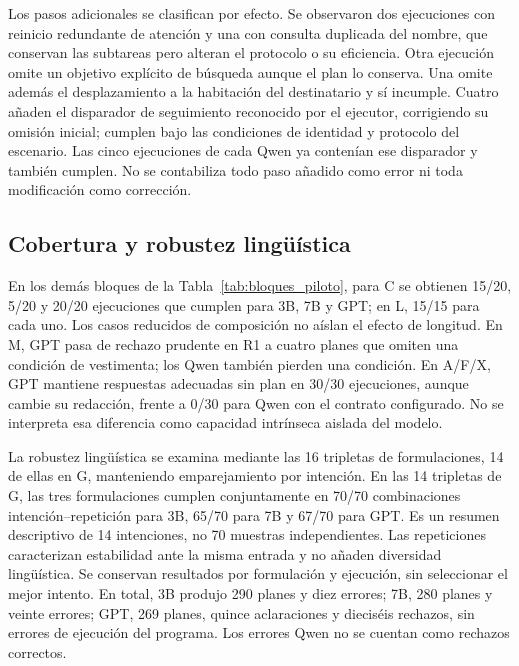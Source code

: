 \documentclass[a4paper,twoside]{article}
\begin{document}
Los pasos adicionales se clasifican por efecto. Se observaron dos ejecuciones con reinicio redundante de atención y una con consulta duplicada del nombre, que conservan las subtareas pero alteran el protocolo o su eficiencia. Otra ejecución omite un objetivo explícito de búsqueda aunque el plan lo conserva. Una omite además el desplazamiento a la habitación del destinatario y sí incumple. Cuatro añaden el disparador de seguimiento reconocido por el ejecutor, corrigiendo su omisión inicial; cumplen bajo las condiciones de identidad y protocolo del escenario. Las cinco ejecuciones de cada Qwen ya contenían ese disparador y también cumplen. No se contabiliza todo paso añadido como error ni toda modificación como corrección.

\subsection{Cobertura y robustez lingüística}
En los demás bloques de la Tabla~\ref{tab:bloques_piloto}, para C se obtienen 15/20, 5/20 y 20/20 ejecuciones que cumplen para 3B, 7B y GPT; en L, 15/15 para cada uno. Los casos reducidos de composición no aíslan el efecto de longitud. En M, GPT pasa de rechazo prudente en R1 a cuatro planes que omiten una condición de vestimenta; los Qwen también pierden una condición. En A/F/X, GPT mantiene respuestas adecuadas sin plan en 30/30 ejecuciones, aunque cambie su redacción, frente a 0/30 para Qwen con el contrato configurado. No se interpreta esa diferencia como capacidad intrínseca aislada del modelo.

La robustez lingüística se examina mediante las 16 tripletas de formulaciones, 14 de ellas en G, manteniendo emparejamiento por intención. En las 14 tripletas de G, las tres formulaciones cumplen conjuntamente en 70/70 combinaciones intención--repetición para 3B, 65/70 para 7B y 67/70 para GPT. Es un resumen descriptivo de 14 intenciones, no 70 muestras independientes. Las repeticiones caracterizan estabilidad ante la misma entrada y no añaden diversidad lingüística. Se conservan resultados por formulación y ejecución, sin seleccionar el mejor intento. En total, 3B produjo 290 planes y diez errores; 7B, 280 planes y veinte errores; GPT, 269 planes, quince aclaraciones y dieciséis rechazos, sin errores de ejecución del programa. Los errores Qwen no se cuentan como rechazos correctos.
\end{document}
